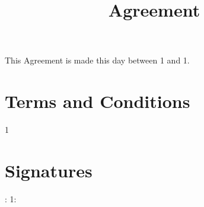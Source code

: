 \documentclass[12pt]{article}
\begin{document}
        \title{Agreement}
        \maketitle

        This Agreement is made this day between 1 and 1.

        \section*{Terms and Conditions}
        1

        \section*{Signatures}
        : \underline{\hspace{4cm}} \hfill 1: \underline{\hspace{4cm}}

        
\end{document}
